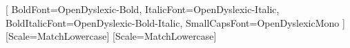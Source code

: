 \usepackage[french]{babel}
\usepackage[utf8x]{inputenc}
\usepackage{lmodern} %

\usepackage{ifxetex}
\ifxetex
    \usepackage{fontspec}
    \setmainfont{OpenDyslexic}
    [
      BoldFont=OpenDyslexic-Bold,
      ItalicFont=OpenDyslexic-Italic,
      BoldItalicFont=OpenDyslexic-Bold-Italic,
      SmallCapsFont=OpenDyslexicMono
    ]
    \setsansfont{OpenDyslexic}[Scale=MatchLowercase]
    \setmonofont{OpenDyslexicMono}[Scale=MatchLowercase]
\else
    \usepackage[T1]{fontenc}
\fi

\usepackage{amsmath}
\usepackage{amsfonts}
\usepackage{latexsym}

\usepackage{amsthm}

\usepackage{authoraftertitle}

\usepackage{datetime}

\usepackage{hyperref}

\usepackage{subcaption}

\usepackage{multirow}
\usepackage[table]{xcolor}
\usepackage{longtable}
\usepackage{float}
\usepackage{array}

\usepackage{xcolor}

\usepackage{multicol}
\usepackage{xspace}

\usepackage{titlesec}

\usepackage{graphicx}

\usepackage{bookmark}

\usepackage[pdf]{graphviz}


\usepackage{magictex}
